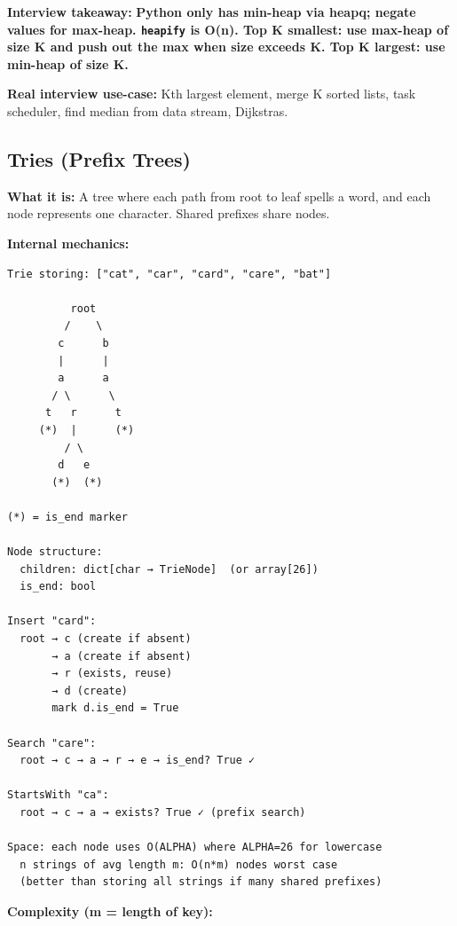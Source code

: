 \documentclass[11pt]{article}
\begin{document}
\textbf{Interview takeaway:} \textbf{Python only has min-heap via heapq; negate values for max-heap. \texttt{heapify} is O(n). Top K smallest: use max-heap of size K and push out the max when size exceeds K. Top K largest: use min-heap of size K.}

\textbf{Real interview use-case:} Kth largest element, merge K sorted lists, task scheduler, find median from data stream, Dijkstra\textquotesingle s.

\subsection{Tries (Prefix Trees)}\label{tries-prefix-trees}

\textbf{What it is:} A tree where each path from root to leaf spells a word, and each node represents one character. Shared prefixes share nodes.

\textbf{Internal mechanics:}

\setcodelang{}

\begin{verbatim}
Trie storing: ["cat", "car", "card", "care", "bat"]

          root
         /    \
        c      b
        |      |
        a      a
       / \      \
      t   r      t
     (*)  |      (*)
         / \
        d   e
       (*)  (*)

(*) = is_end marker

Node structure:
  children: dict[char → TrieNode]  (or array[26])
  is_end: bool

Insert "card":
  root → c (create if absent)
       → a (create if absent)
       → r (exists, reuse)
       → d (create)
       mark d.is_end = True

Search "care":
  root → c → a → r → e → is_end? True ✓

StartsWith "ca":
  root → c → a → exists? True ✓ (prefix search)

Space: each node uses O(ALPHA) where ALPHA=26 for lowercase
  n strings of avg length m: O(n*m) nodes worst case
  (better than storing all strings if many shared prefixes)
\end{verbatim}

\textbf{Complexity (m = length of key):}
\end{document}
